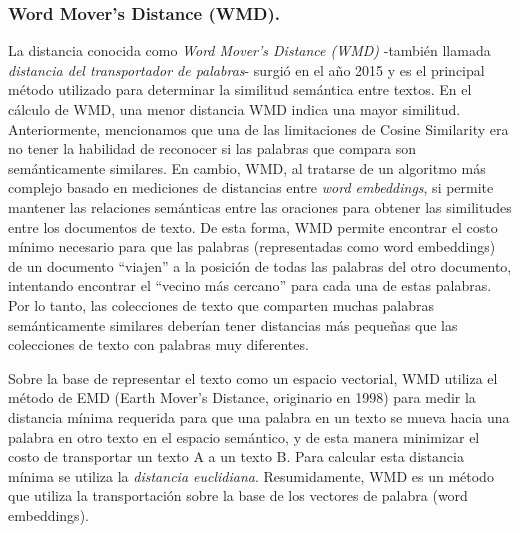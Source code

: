 \documentclass[12pt,a4paper]{article}
\begin{document}
\begin{sloppypar}
\cleardoublepage

\subsubsection{Word Mover’s Distance (WMD).}\label{wmd}

La distancia conocida como \textit{Word Mover’s Distance (WMD)} -también llamada \textit{distancia del transportador de palabras}- surgió en el año 2015\cite{wmd_paper} y es el principal método utilizado para determinar la similitud semántica entre textos\cite{similarity_survey}. En el cálculo de WMD, una menor distancia WMD indica una mayor similitud.
Anteriormente, mencionamos que una de las limitaciones de Cosine Similarity era no tener la habilidad de reconocer si las palabras que compara son semánticamente similares. En cambio, WMD, al tratarse de un algoritmo más complejo basado en mediciones de distancias entre \textit{word embeddings}, si permite mantener las relaciones semánticas entre las oraciones para obtener las similitudes entre los documentos de texto. De esta forma, WMD permite encontrar el costo mínimo necesario para que las palabras (representadas como word embeddings) de un documento “viajen” a la posición de todas las palabras del otro documento, intentando encontrar el “vecino más cercano” para cada una de estas palabras. Por lo tanto, las colecciones de texto que comparten muchas palabras semánticamente similares deberían tener distancias más pequeñas que las colecciones de texto con palabras muy diferentes\cite{NLP_21}.

Sobre la base de representar el texto como un espacio vectorial, WMD utiliza el método de EMD (Earth Mover’s Distance, originario en 1998)\cite{WMD_3, WMD_4} para medir la distancia mínima requerida para que una palabra en un texto se mueva hacia una palabra en otro texto en el espacio semántico, y de esta manera minimizar el costo de transportar un texto A a un texto B\cite{WMD_5}. Para calcular esta distancia mínima se utiliza la \textit{distancia euclidiana}. Resumidamente, WMD es un método que utiliza la transportación sobre la base de los vectores de palabra (word embeddings)\cite{wmd_paper}.


\end{sloppypar}
\end{document}
